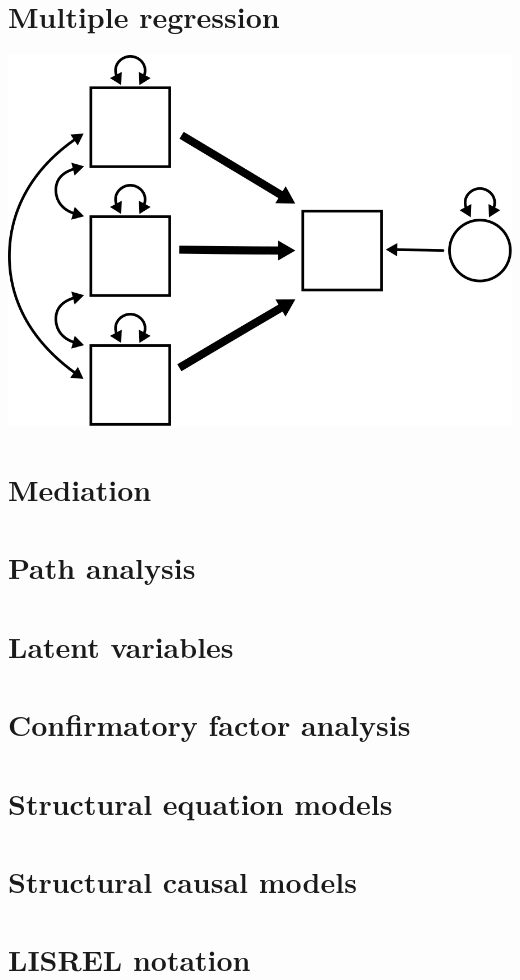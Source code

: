 \documentclass[
]{book}
\begin{document}
\hypertarget{multiple}{%
\chapter{Multiple regression}\label{multiple}}

\begin{center}\includegraphics{graphics/multiple_regression} \end{center}

\hypertarget{mediation}{%
\chapter{Mediation}\label{mediation}}

\hypertarget{path-analysis}{%
\chapter{Path analysis}\label{path-analysis}}

\hypertarget{latent-variables}{%
\chapter{Latent variables}\label{latent-variables}}

\hypertarget{confirmatory-factor-analysis}{%
\chapter{Confirmatory factor analysis}\label{confirmatory-factor-analysis}}

\hypertarget{structural-equation-models}{%
\chapter{Structural equation models}\label{structural-equation-models}}

\hypertarget{structural-causal-models}{%
\chapter{Structural causal models}\label{structural-causal-models}}

\hypertarget{appendix-appendix}{%
\appendix}


\hypertarget{lisrel-notation}{%
\chapter{LISREL notation}\label{lisrel-notation}}

  
\end{document}
